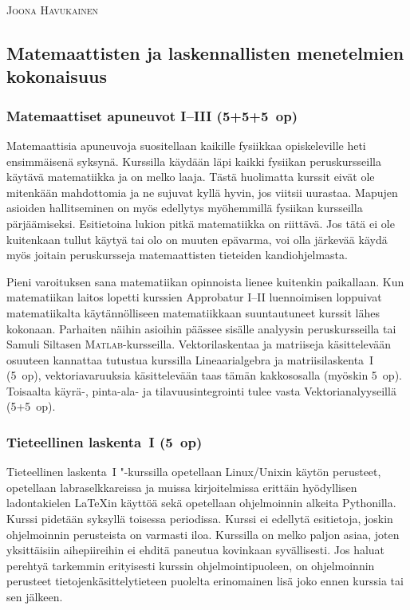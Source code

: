 \documentclass[../ala_hataile.tex]{subfiles}
\begin{document}
	\vspace{0.5cm}
	\noindent\textsc{Joona Havukainen}
	
	\subsection*{Matemaattisten ja laskennallisten menetelmien kokonaisuus}
	\subsubsection*{Matemaattiset apuneuvot I--III (5+5+5~op)}
	Matemaattisia apuneuvoja
	suositellaan kaikille fysiikkaa opiskeleville
	heti ensimmäisenä syksynä. Kurssilla
	käydään läpi kaikki fysiikan perus\-kursseilla
	käytävä matematiikka ja on melko laaja. Tästä huolimatta kurssit eivät
	ole mitenkään mahdottomia ja ne sujuvat
	kyllä hyvin, jos viitsii uurastaa. Mapujen
	asioiden hallitseminen on myös edellytys
	myöhemmillä fysiikan kursseilla pärjäämiseksi.
	Esi\-tietoina lukion pitkä matematiikka
	on riittävä. Jos tätä ei ole kuitenkaan tullut
	käytyä tai olo on muuten epävarma, voi
	olla järkevää käydä myös joitain perus\-kursseja
	matemaattisten tieteiden kandiohjelmasta.
	
	Pieni varoituksen sana matematiikan opinnoista lienee kuitenkin paikallaan.
	Kun matematiikan laitos lopetti
	kurssien Approbatur I--II luennoimisen
	loppuivat matematiikalta käytännölliseen
	matematiikkaan suuntautuneet
	kurssit lähes kokonaan. Parhaiten näihin
	asioihin päässee sisälle analyysin peruskursseilla tai Samuli Siltasen \textsc{Matlab}-kursseilla. Vektori\-laskentaa ja
	matriiseja käsittelevään osuuteen kannattaa
	tutustua kurssilla Lineaari\-algebra ja matriisi\-laskenta~I (5~op), vektori\-avaruuksia käsittelevään
	taas tämän kakkos\-osalla (myöskin
	5~op). Toisaalta käyrä-, pinta-ala- ja tilavuus\-integrointi
	tulee vasta Vektorianalyyseillä
	(5+5~op).
	
	\subsubsection*{Tieteellinen laskenta~I (5~op)}
	Tieteellinen laskenta~I "-kurssilla opetellaan
	Linux/Unixin käytön perusteet, opetellaan
	labra\-selkkareissa ja muissa kirjoitelmissa
	erittäin hyödyllisen ladontakielen
	{\LaTeX}in käyttöä sekä opetellaan ohjelmoinnin
	alkeita Pythonilla.
	Kurssi pidetään syksyllä toisessa periodissa. Kurssi ei edellytä esitietoja,
	joskin ohjelmoinnin perusteista on
	varmasti iloa. Kurssilla on melko paljon
	asiaa, joten yksittäisiin aihe\-piireihin ei ehditä
	paneutua kovinkaan syvällisesti. Jos
	haluat perehtyä tarkemmin erityisesti kurssin
	ohjelmointi\-puoleen, on ohjelmoinnin
	perusteet tietojen\-käsittely\-tieteen puolelta
	erinomainen lisä joko ennen kurssia tai sen
	jälkeen.
	
\end{document}
